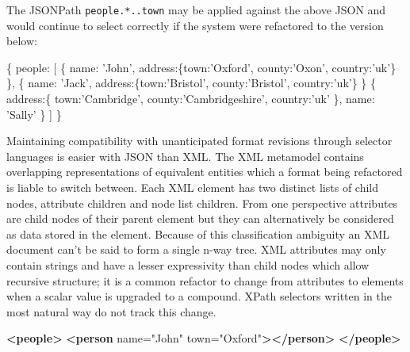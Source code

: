 \documentclass[12pt, ]{article}
\newenvironment{Shaded}{}{}
\newcommand{\KeywordTok}[1]{\textcolor[rgb]{0.00,0.44,0.13}{\textbf{{#1}}}}
\newcommand{\DataTypeTok}[1]{\textcolor[rgb]{0.56,0.13,0.00}{{#1}}}
\newcommand{\StringTok}[1]{\textcolor[rgb]{0.25,0.44,0.63}{{#1}}}
\newcommand{\OtherTok}[1]{\textcolor[rgb]{0.00,0.44,0.13}{{#1}}}
\newcommand{\NormalTok}[1]{{#1}}
\begin{document}
The JSONPath \texttt{people.*..town} may be applied against the above
JSON and would continue to select correctly if the system were
refactored to the version below:

\begin{Shaded}
\begin{Highlighting}[]
\NormalTok{\{}
   \DataTypeTok{people}\NormalTok{: [}
      \NormalTok{\{  }\DataTypeTok{name}\NormalTok{: }\StringTok{'John'}\NormalTok{, }
         \DataTypeTok{address}\NormalTok{:\{}\DataTypeTok{town}\NormalTok{:}\StringTok{'Oxford'}\NormalTok{, }\DataTypeTok{county}\NormalTok{:}\StringTok{'Oxon'}\NormalTok{, }\DataTypeTok{country}\NormalTok{:}\StringTok{'uk'}\NormalTok{\}}
      \NormalTok{\},}
      \NormalTok{\{  }\DataTypeTok{name}\NormalTok{: }\StringTok{'Jack'}\NormalTok{,}
         \DataTypeTok{address}\NormalTok{:\{}\DataTypeTok{town}\NormalTok{:}\StringTok{'Bristol'}\NormalTok{, }\DataTypeTok{county}\NormalTok{:}\StringTok{'Bristol'}\NormalTok{, }\DataTypeTok{country}\NormalTok{:}\StringTok{'uk'}\NormalTok{\}}
      \NormalTok{\}}
      \NormalTok{\{  }\DataTypeTok{address}\NormalTok{:\{}
            \DataTypeTok{town}\NormalTok{:}\StringTok{'Cambridge'}\NormalTok{, }\DataTypeTok{county}\NormalTok{:}\StringTok{'Cambridgeshire'}\NormalTok{, }
            \DataTypeTok{country}\NormalTok{:}\StringTok{'uk'}
         \NormalTok{\},}
         \DataTypeTok{name}\NormalTok{: }\StringTok{'Sally'}
      \NormalTok{\}}
   \NormalTok{]}
\NormalTok{\}}
\end{Highlighting}
\end{Shaded}

Maintaining compatibility with unanticipated format revisions through
selector languages is easier with JSON than XML. The XML metamodel
contains overlapping representations of equivalent entities which a
format being refactored is liable to switch between. Each XML element
has two distinct lists of child nodes, attribute children and node list
children. From one perspective attributes are child nodes of their
parent element but they can alternatively be considered as data stored
in the element. Because of this classification ambiguity an XML document
can't be said to form a single n-way tree. XML attributes may only
contain strings and have a lesser expressivity than child nodes which
allow recursive structure; it is a common refactor to change from
attributes to elements when a scalar value is upgraded to a compound.
XPath selectors written in the most natural way do not track this
change.

\begin{Shaded}
\begin{Highlighting}[]
\KeywordTok{<people>}
   \KeywordTok{<person}\OtherTok{ name=}\StringTok{"John"}\OtherTok{ town=}\StringTok{"Oxford"}\KeywordTok{></person>}
\KeywordTok{</people>}
\end{Highlighting}
\end{Shaded}
\end{document}
